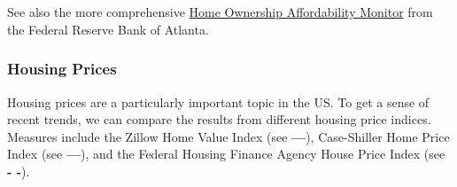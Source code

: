 \begin{minipage}{0.76\textwidth}
\small 
\end{minipage}
\vspace{-1mm}

\begin{minipage}{0.44\textwidth} 
\\
\end{minipage} \hspace{5mm}
\begin{minipage}{0.28\textwidth}
\small 
\end{minipage}
\vspace{0.5mm}

\begin{minipage}{0.76\textwidth}
\vspace*{-4.5mm}

{\footnotesize {}}
\vspace*{-2.5mm}
	
\\
\footnotesize{See also the more comprehensive \href{https://www.atlantafed.org/center-for-housing-and-policy/data-and-tools/home-ownership-affordability-monitor}{Home Ownership Affordability Monitor} from the Federal Reserve Bank of Atlanta.}
\vspace{2mm}

\subsubsection*{Housing Prices}   

\small Housing prices are a particularly important topic in the US. To get a sense of recent trends, we can compare the results from different housing price indices. Measures include the Zillow Home Value Index (see {\color{violet}\textbf{---}}), Case-Shiller Home Price Index (see {\color{cyan}\textbf{---}}), and the Federal Housing Finance Agency House Price Index (see {\color{magenta}\textbf{- -}}).  
\end{minipage}

